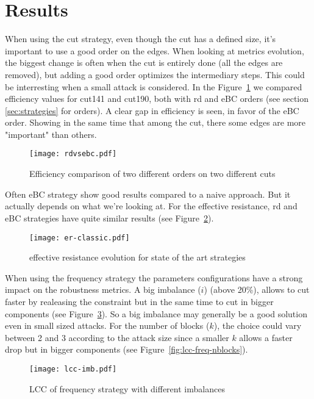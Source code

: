 \section{Results}
\label{sec:results}

When using the cut strategy, even though the cut has a defined size, it's important to use a good order on the edges. When looking at metrics evolution, the biggest change is often when the cut is entirely done (all the edges are removed), but adding a good order optimizes the intermediary steps. This could be interresting when a small attack is considered. In the Figure~\ref{fig:efficiency-rd-vs-bc} we compared efficiency values for cut141 and cut190, both with rd and eBC orders (see section \ref{sec:strategies} for orders). A clear gap in efficiency is seen, in favor of the eBC order. Showing in the same time that among the cut, there some edges are more "important" than others.

\begin{figure}[!hbt]
    \centering
    \texttt{[image: rdvsebc.pdf]}
    \caption{Efficiency comparison of two different orders on two different cuts}
    \label{fig:efficiency-rd-vs-bc}
\end{figure}

Often eBC strategy show good results compared to a naive approach. But it actually depends on what we're looking at. For the effective resistance, rd and eBC strategies have quite similar results (see Figure~\ref{fig:er-classic}).

\begin{figure}[!hbt]
    \centering
    \texttt{[image: er-classic.pdf]}
    \caption{effective resistance evolution for state of the art strategies}
    \label{fig:er-classic}
\end{figure}

When using the frequency strategy the parameters configurations have a strong impact on the robustness metrics. A big imbalance ($i$) (above 20\%), allows to cut faster by realeasing the constraint but in the same time to cut in bigger components (see Figure~\ref{fig:lcc-freq-imb}). So a big imbalance may generally be a good solution even in small sized attacks. For the number of blocks ($k$), the choice could vary between 2 and 3 according to the attack size since a smaller $k$ allows a faster drop but in bigger components (see Figure~\ref{fig:lcc-freq-nblocks}).

\begin{figure}[!hbt]
    \centering
    \texttt{[image: lcc-imb.pdf]}
    \caption{LCC of frequency strategy with different imbalances}
    \label{fig:lcc-freq-imb}
\end{figure}

